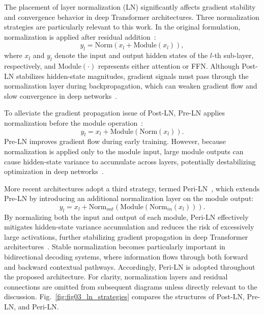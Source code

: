 The placement of layer normalization (LN) significantly affects gradient stability and convergence behavior in deep Transformer architectures. Three normalization strategies are particularly relevant to this work. In the original formulation, normalization is applied after residual addition~\cite{vaswaniAttentionAllYou2017}:
\begin{equation}
y_l=\mathrm{Norm}(x_l+\mathrm{Module}(x_l)),
\end{equation}
where $x_l$ and $y_l$ denote the input and output hidden states of the $l$-th sub-layer, respectively, and $\mathrm{Module}(\cdot)$ represents either attention or FFN. Although Post-LN stabilizes hidden-state magnitudes, gradient signals must pass through the normalization layer during backpropagation, which can weaken gradient flow and slow convergence in deep networks~\cite{xiongLayerNormalizationTransformer2020}.

To alleviate the gradient propagation issue of Post-LN, Pre-LN applies normalization before the module operation~\cite{xiongLayerNormalizationTransformer2020}:
\begin{equation}
y_l=x_l+\mathrm{Module}(\mathrm{Norm}(x_l)).
\end{equation}
Pre-LN improves gradient flow during early training. However, because normalization is applied only to the module input, large module outputs can cause hidden-state variance to accumulate across layers, potentially destabilizing optimization in deep networks~\cite{kimPeriLNRevisitingNormalization2025}.

More recent architectures adopt a third strategy, termed \mbox{Peri-LN~\cite{kimPeriLNRevisitingNormalization2025}}, which extends Pre-LN by introducing an additional normalization layer on the module output:
\begin{equation}
y_l=x_l+{\mathrm{Norm}}_{\textit{out}}(\mathrm{Module}({\mathrm{Norm}}_{\textit{in}}(x_l))).
\end{equation}
By normalizing both the input and output of each module, Peri-LN effectively mitigates hidden-state variance accumulation and reduces the risk of excessively large activations, further stabilizing gradient propagation in deep Transformer architectures~\cite{kimPeriLNRevisitingNormalization2025}. Stable normalization becomes particularly important in bidirectional decoding systems, where information flows through both forward and backward contextual pathways. Accordingly, Peri-LN is adopted throughout the proposed architecture. For clarity, normalization layers and residual connections are omitted from subsequent diagrams unless directly relevant to the discussion. Fig.~\ref{fig:fig03_ln_strategies} compares the structures of Post-LN, Pre-LN, and Peri-LN.

